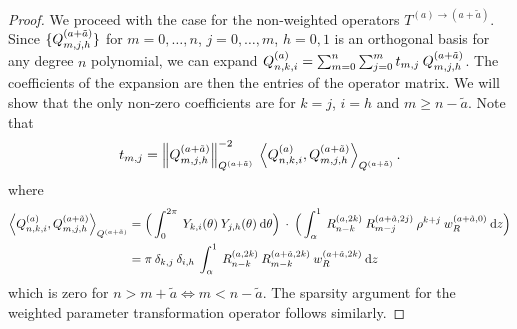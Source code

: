 \documentclass[11pt, oneside]{article}   	%
\begin{document}
\begin{proof}
We proceed with the case for the non-weighted operators $T^{(a)\to(a+\tilde a)}$. Since $\{Q_{m,j,h}^{(a+\tilde{a})}\}$ for $m = 0,\dots,n$, $j = 0,\dots,m$, $h = 0,1$ is an orthogonal basis for any degree $n$ polynomial, we can expand $Q_{n,k,i}^{(a)} = \sum_{m=0}^{n} \sum_{j=0}^m t_{m,j} \: Q_{m,j,h}^{(a+\tilde{a})}$. The coefficients of the expansion are then the entries of the operator matrix. We will show that the only non-zero coefficients are for $k = j$, $i = h$ and $m \ge  n - \tilde a$. Note that
\begin{align*}
	t_{m,j} = \norm{\scopmjh^{(a+\tilde{a})}}^{-2}_{\scop^{(a+\tilde a)}} \: \ip< \scopnkia, \scopmjh^{(a+\tilde{a})}>_{\scop^{(a+\tilde a)}}.
\end{align*}
where
\begin{align*}
	\ip< \scopnkia, \scopmjh^{(a+\tilde{a})}>_{\scop^{(a+\tilde a)}} &= \Big( \int_0^{2\pi} \: \chki(\theta) \: \chjh(\theta) \: \D \theta \Big) \: \cdot \: \Big( \int_\alpha^1 \: \genjacnmk^{(a, 2k)} \: \genjacmmj^{(a+\tilde a,2j)} \: \rho^{k+j} \: \genjacw^{(a + \tilde a, 0)} \: \D z \Big) \\
	&= \pi \: \delta_{k,j} \: \delta_{i,h} \: \int_\alpha^1 \: \genjacnmk^{(a, 2k)} \: \genjac_{m-k}^{(a+\tilde a,2k)} \: \genjacw^{(a + \tilde a, 2k)} \: \D z
\end{align*}
which is zero for $n > m + \tilde a \iff m < n - \tilde a$. The sparsity argument for the weighted parameter transformation operator follows similarly.
\end{proof}
\end{document}
